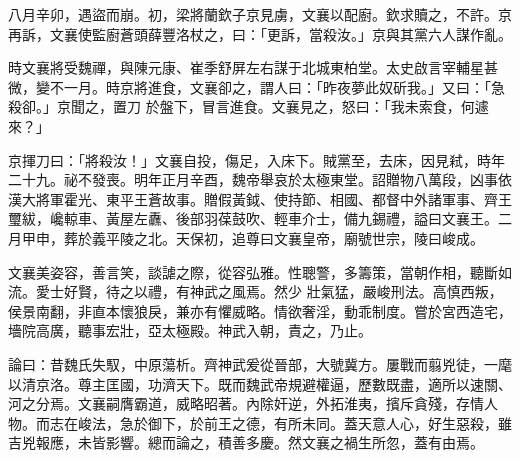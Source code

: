 \begin{pinyinscope}
 八月辛卯，遇盜而崩。初，梁將蘭欽子京見虜，文襄以配廚。欽求贖之，不許。京再訴，文襄使監廚蒼頭薛豐洛杖之，曰：「更訴，當殺汝。」京與其黨六人謀作亂。



 時文襄將受魏禪，與陳元康、崔季舒屏左右謀于北城東柏堂。太史啟言宰輔星甚微，變不一月。時京將進食，文襄卻之，謂人曰：「昨夜夢此奴斫我。」又曰：「急殺卻。」京聞之，置刀
 於盤下，冒言進食。文襄見之，怒曰：「我未索食，何遽來？」



 京揮刀曰：「將殺汝！」文襄自投，傷足，入床下。賊黨至，去床，因見弒，時年二十九。祕不發喪。明年正月辛酉，魏帝舉哀於太極東堂。詔贈物八萬段，凶事依漢大將軍霍光、東平王蒼故事。贈假黃鉞、使持節、相國、都督中外諸軍事、齊王璽紱，巉輬車、黃屋左纛、後部羽葆鼓吹、輕車介士，備九錫禮，謚曰文襄王。二月甲申，葬於義平陵之北。天保初，追尊曰文襄皇帝，廟號世宗，陵曰峻成。



 文襄美姿容，善言笑，談謔之際，從容弘雅。性聰警，多籌策，當朝作相，聽斷如流。愛士好賢，待之以禮，有神武之風焉。然少
 壯氣猛，嚴峻刑法。高慎西叛，侯景南翻，非直本懷狼戾，兼亦有懼威略。情欲奢淫，動乖制度。嘗於宮西造宅，墻院高廣，聽事宏壯，亞太極殿。神武入朝，責之，乃止。



 論曰：昔魏氏失馭，中原蕩析。齊神武爰從晉部，大號冀方。屢戰而翦兇徒，一麾以清京洛。尊主匡國，功濟天下。既而魏武帝規避權逼，歷數既盡，適所以速關、河之分焉。文襄嗣膺霸道，威略昭著。內除奸逆，外拓淮夷，擯斥貪殘，存情人物。而志在峻法，急於御下，於前王之德，有所未同。蓋天意人心，好生惡殺，雖吉兇報應，未皆影響。總而論之，積善多慶。然文襄之禍生所忽，蓋有由焉。



\end{pinyinscope}